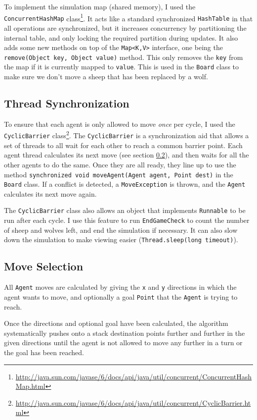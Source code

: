\documentclass[pdftex,10pt]{article}
\begin{document}
To implement the simulation map (shared memory), I used the {\tt ConcurrentHashMap} class\footnote{\url{http://java.sun.com/javase/6/docs/api/java/util/concurrent/ConcurrentHashMap.html}}.  It acts like a standard synchronized {\tt HashTable} in that all operations are synchronized, but it increases concurrency by partitioning the internal table, and only locking the required partition during updates.  It also adds some new methods on top of the {\tt Map<K,V>} interface, one being the {\tt remove(Object key, Object value)} method.  This only removes the {\tt key} from the map if it is currently mapped to {\tt value}.  This is used in the {\tt Board} class to make sure we don't move a sheep that has been replaced by a wolf.

\subsection{Thread Synchronization}\label{threadSync}
To ensure that each agent is only allowed to move {\em once} per cycle, I used the {\tt CyclicBarrier} class\footnote{\url{http://java.sun.com/javase/6/docs/api/java/util/concurrent/CyclicBarrier.html}}.  The {\tt CyclicBarrier} is a synchronization aid that allows a set of threads to all wait for each other to reach a common barrier point.  Each agent thread calculates its next move (see section \ref{moveSel}), and then waits for all the other agents to do the same.  Once they are all ready, they line up to use the method {\tt synchronized void moveAgent(Agent agent, Point dest)} in the {\tt Board} class.  If a conflict is detected, a {\tt MoveException} is thrown, and the {\tt Agent} calculates its next move again.

The {\tt CyclicBarrier} class also allows an object that implements {\tt Runnable} to be run after each cycle.  I use this feature to run {\tt EndGameCheck} to count the number of sheep and wolves left, and end the simulation if necessary.  It can also slow down the simulation to make viewing easier ({\tt Thread.sleep(long timeout)}).

\subsection{Move Selection}\label{moveSel}
All {\tt Agent} moves are calculated by giving the {\tt x} and {\tt y} directions in which the agent wants to move, and optionally a goal {\tt Point} that the {\tt Agent} is trying to reach.

Once the directions and optional goal have been calculated, the algorithm systematically pushes onto a stack destination points further and further in the given directions until the agent is not allowed to move any further in a turn or the goal has been reached.
\end{document}
